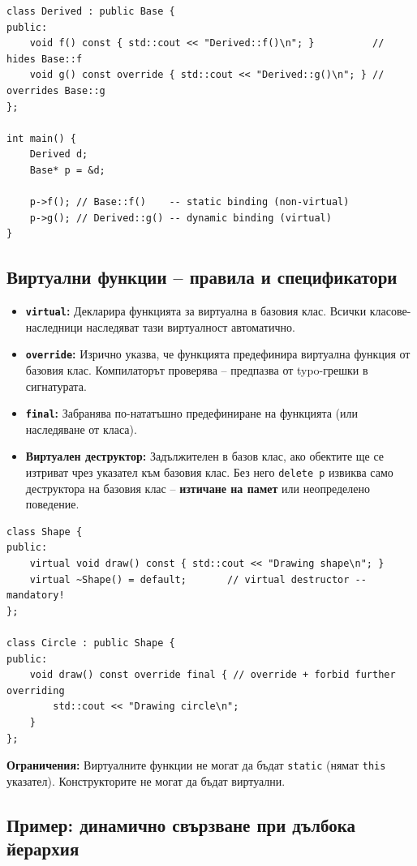 \documentclass{scrartcl}
\begin{document}
\begin{FlushLeft}
\begin{lstlisting}
class Derived : public Base {
public:
    void f() const { std::cout << "Derived::f()\n"; }          // hides Base::f
    void g() const override { std::cout << "Derived::g()\n"; } // overrides Base::g
};

int main() {
    Derived d;
    Base* p = &d;

    p->f(); // Base::f()    -- static binding (non-virtual)
    p->g(); // Derived::g() -- dynamic binding (virtual)
}
\end{lstlisting}

\subsection{Виртуални функции -- правила и спецификатори}

\begin{itemize}
    \item \textbf{\texttt{virtual}:} Декларира функцията за виртуална в базовия клас. Всички класове-наследници наследяват тази виртуалност автоматично.
    \item \textbf{\texttt{override}:} Изрично указва, че функцията предефинира виртуална функция от базовия клас. Компилаторът проверява -- предпазва от typo-грешки в сигнатурата.
    \item \textbf{\texttt{final}:} Забранява по-нататъшно предефиниране на функцията (или наследяване от класа).
    \item \textbf{Виртуален деструктор:} Задължителен в базов клас, ако обектите ще се изтриват чрез указател към базовия клас. Без него \texttt{delete p} извиква само деструктора на базовия клас -- \textbf{изтичане на памет} или неопределено поведение.
\end{itemize}

\begin{lstlisting}
class Shape {
public:
    virtual void draw() const { std::cout << "Drawing shape\n"; }
    virtual ~Shape() = default;       // virtual destructor -- mandatory!
};

class Circle : public Shape {
public:
    void draw() const override final { // override + forbid further overriding
        std::cout << "Drawing circle\n";
    }
};
\end{lstlisting}

\textbf{Ограничения:} Виртуалните функции не могат да бъдат \texttt{static} (нямат \texttt{this} указател). Конструкторите не могат да бъдат виртуални.

\subsection{Пример: динамично свързване при дълбока йерархия}


\end{FlushLeft}
\end{document}

